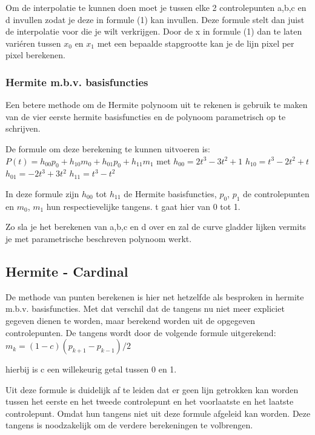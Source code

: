 \documentclass[a4paper,11pt,oneside, titlepage]{article}
\begin{document}
Om de interpolatie te kunnen doen moet je tussen elke 2 controlepunten a,b,c en d invullen
zodat je deze in formule (1) kan invullen. Deze formule stelt dan juist de interpolatie 
voor die je wilt verkrijgen. Door de x in formule (1) dan te laten vari\'eren tussen 
$x_0$ en $x_1$ met een bepaalde stapgrootte kan je de lijn pixel per pixel berekenen.
\subsubsection{Hermite m.b.v. basisfuncties}
Een betere methode om de Hermite polynoom uit te rekenen is gebruik te maken van de vier 
eerste hermite basisfuncties en de polynoom parametrisch op te schrijven.

De formule om deze berekening te kunnen uitvoeren is:\newline
$P(t) = h_{00}p_0 + h_{10}m_0 + h_{01}p_0 + h_{11}m_1$\newline
met\newline
$h_{00} = 2t^3 - 3t^2 + 1$\newline
$h_{10} = t^3 - 2t^2 + t$\newline
$h_{01} = -2t^3 + 3t^2$\newline
$h_{11} = t^3 - t^2$\newline

In deze formule zijn $h_{00}$ tot $h_{11}$ de Hermite basisfuncties, $p_0$, $p_1$ 
de controlepunten en $m_0$, $m_1$ hun respectievelijke tangens. t gaat hier van 0 tot 1.

Zo sla je het berekenen van a,b,c en d over en zal de curve gladder lijken vermits je
met parametrische beschreven polynoom werkt.
\subsection{Hermite - Cardinal}
De methode van punten berekenen is hier net hetzelfde als besproken in hermite m.b.v. 
basisfuncties.
Met dat verschil dat de tangens nu niet meer expliciet gegeven dienen te worden, maar 
berekend worden uit de opgegeven controlepunten. 
De tangens wordt door de volgende formule uitgerekend:\newline 
$m_k = (1 - c)(p_{k+1} -p_{k-1})/2$

hierbij is c een willekeurig getal tussen 0 en 1.

Uit deze formule is duidelijk af te leiden dat er geen lijn getrokken kan worden 
tussen het eerste en het tweede controlepunt en het voorlaatste en het laatste controlepunt. 
Omdat hun tangens niet uit deze formule afgeleid kan worden. Deze tangens is noodzakelijk
om de verdere berekeningen te volbrengen.
\end{document}
